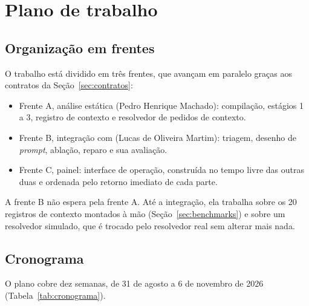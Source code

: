 \chapter{Plano de trabalho}
\label{cap:plano}


\section{Organização em frentes}
\label{sec:divisao}

O trabalho está dividido em três frentes, que avançam em paralelo graças aos
contratos da Seção~\ref{sec:contratos}:

\begin{itemize}
  \item Frente A, análise estática (Pedro Henrique Machado):
    compilação, estágios 1 a 3, registro de contexto e resolvedor de pedidos de
    contexto.
  \item Frente B, integração com \llm (Lucas de Oliveira Martim):
    triagem, desenho de \textit{prompt}, ablação, reparo e sua avaliação.
  \item Frente C, painel: interface de operação, construída no tempo
    livre das outras duas e ordenada pelo retorno imediato de cada parte.
\end{itemize}

A frente B não espera pela frente A. Até a integração, ela trabalha sobre os 20
registros de contexto montados à mão (Seção~\ref{sec:benchmarks}) e sobre um
resolvedor simulado, que é trocado pelo resolvedor real sem alterar mais nada.

\section{Cronograma}
\label{sec:cronograma}

O plano cobre dez semanas, de 31 de agosto a 6 de novembro de 2026
(Tabela~\ref{tab:cronograma}).

